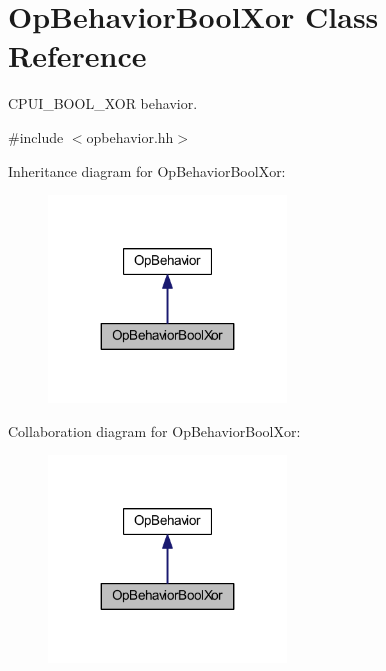 \hypertarget{class_op_behavior_bool_xor}{}\section{Op\+Behavior\+Bool\+Xor Class Reference}
\label{class_op_behavior_bool_xor}


C\+P\+U\+I\+\_\+\+B\+O\+O\+L\+\_\+\+X\+OR behavior.  




{\ttfamily \#include $<$opbehavior.\+hh$>$}



Inheritance diagram for Op\+Behavior\+Bool\+Xor\+:
\nopagebreak
\begin{figure}[H]
\begin{center}
\leavevmode
\includegraphics[width=179pt]{class_op_behavior_bool_xor__inherit__graph}
\end{center}
\end{figure}


Collaboration diagram for Op\+Behavior\+Bool\+Xor\+:
\nopagebreak
\begin{figure}[H]
\begin{center}
\leavevmode
\includegraphics[width=179pt]{class_op_behavior_bool_xor__coll__graph}
\end{center}
\end{figure}
